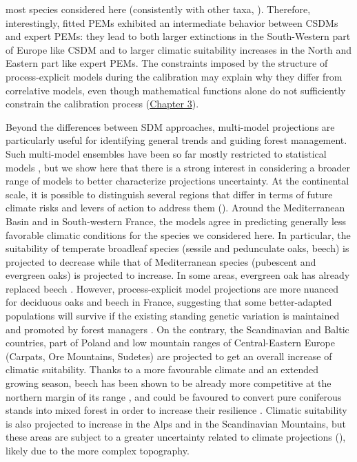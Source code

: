 most species considered here (consistently with other taxa, \citealp{Buckley2010}). Therefore, interestingly, fitted PEMs exhibited an intermediate behavior between CSDMs and expert PEMs: they lead to both larger extinctions in the South-Western part of Europe like CSDM and to larger climatic suitability increases in the North and Eastern part like expert PEMs. The constraints imposed by the structure of process-explicit models during the calibration may explain why they differ from correlative models, even though mathematical functions alone do not suﬀiciently constrain the calibration process (\hyperref[chapter3]{Chapter 3}).

Beyond the differences between SDM approaches, multi-model projections are particularly useful for identifying general trends and guiding forest management. Such multi-model ensembles have been so far mostly restricted to statistical models \citep{Simmonds2024}, but we show here that there is a strong interest in considering a broader range of models to better characterize projections uncertainty. At the continental scale, it is possible to distinguish several regions that differ in terms of future climate risks and levers of action to address them (). Around the Mediterranean Basin and in South-western France, the models agree in predicting generally less favorable climatic conditions for the species we considered here. In particular, the suitability of temperate broadleaf species (sessile and pedunculate oaks, beech) is projected to decrease while that of Mediterranean species (pubescent and evergreen oaks) is projected to increase. In some areas, evergreen oak has already replaced beech \citep{Penuelas2003}. However, process-explicit model projections are more nuanced for deciduous oaks and beech in France, suggesting that some better-adapted populations will survive if the existing standing genetic variation is maintained and promoted by forest managers \citep{Brang2014}. On the contrary, the Scandinavian and Baltic countries, part of Poland and low mountain ranges of Central-Eastern Europe (Carpats, Ore Mountains, Sudetes) are projected to get an overall increase of climatic suitability. Thanks to a more favourable climate and an extended growing season, beech has been shown to be already more competitive at the northern margin of its range \citep{Bolte2010}, and could be favoured to convert pure coniferous stands into mixed forest in order to increase their resilience \citep{Schauer2023}. Climatic suitability is also projected to increase in the Alps and in the Scandinavian Mountains, but these areas are subject to a greater uncertainty related to climate projections (), likely due to the more complex topography. 

